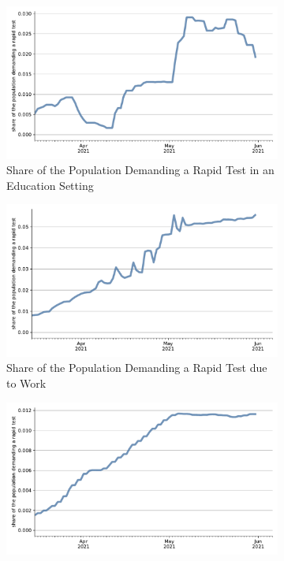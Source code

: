 \begin{figure}[ht]
  \centering
  \begin{subfigure}[b]{0.425\textwidth}
    \centering
    \includegraphics[width=\textwidth]{../figures/results/figures/rapid_test_statistics/educ_demand_share}
    \caption{Share of the Population Demanding a Rapid Test in an Education Setting}
    \label{fig:educ_rapid_test_demand}
  \end{subfigure}
  \hfill
  \begin{subfigure}[b]{0.425\textwidth}
    \centering
    \includegraphics[width=\textwidth]{../figures/results/figures/rapid_test_statistics/work_demand_share}
    \caption{Share of the Population Demanding a Rapid Test due to Work}
    \label{fig:work_rapid_test_demand}
  \end{subfigure}
  \hfill
  \begin{subfigure}[b]{0.425\textwidth}
    \centering
    \includegraphics[width=\textwidth]{../figures/results/figures/rapid_test_statistics/private_demand_share}

\end{subfigure}
\end{figure}
